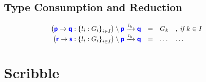 \documentclass{article}
\begin{document}
\subsection{Type Consumption and Reduction}
\doublespacing
\[
\begin{array}{rcll}
	\tyreduct{\left(\gcomm{p}{q}{l_i: G_i}{i \in I}\right)}{p}{q}{l_k} & = & G_k & \textit{, if $k \in I$}\\
	\tyreduct{\left(\gcomm{r}{s}{l_i: G_i}{i \in I}\right)}{p}{q}{l_k} & = & \dots & \dots \\
\end{array}
\]
\singlespacing

\section{Scribble}
\end{document}
